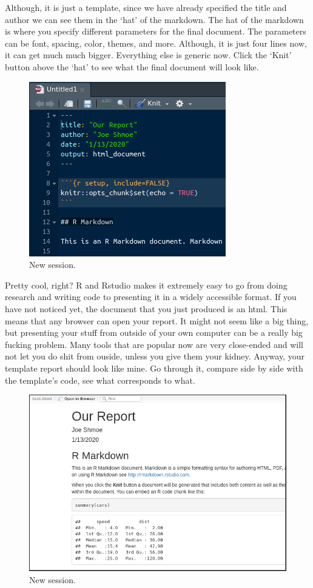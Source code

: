 \documentclass[]{book}
\begin{document}
Although, it is just a template, since we have already specified the title and author we can see them in the `hat' of the markdown. The hat of the markdown is where you specify different parameters for the final document. The parameters can be font, spacing, color, themes, and more. Although, it is just four lines now, it can get much much bigger. Everything else is generic now. Click the `Knit' button above the `hat' to see what the final document will look like.

\begin{figure}
\centering
\includegraphics{markdown2.png}
\caption{New session.}
\end{figure}

Pretty cool, right? R and Rstudio makes it extremely easy to go from doing research and writing code to presenting it in a widely accessible format. If you have not noticed yet, the document that you just produced is an html. This means that any browser can open your report. It might not seem like a big thing, but presenting your stuff from outside of your own computer can be a really big fucking problem. Many tools that are popular now are very close-ended and will not let you do shit from ouside, unless you give them your kidney. Anyway, your template report should look like mine. Go through it, compare side by side with the template's code, see what corresponds to what.

\begin{figure}
\centering
\includegraphics{markdown3.png}
\caption{New session.}
\end{figure}
\end{document}
